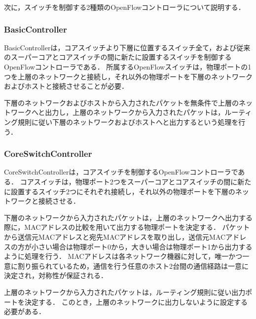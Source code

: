 次に，スイッチを制御する2種類のOpenFlowコントローラについて説明する．

\subsubsection{BasicController}

BasicControllerは，コアスイッチより下層に位置するスイッチ全て，および従来のスーパーコアとコアスイッチの間に新たに設置するスイッチを制御するOpenFlowコントローラである．
所属するOpenFlowスイッチは，物理ポートの1つを上層のネットワークと接続し，それ以外の物理ポートを下層のネットワークおよびホストと接続させることが必要．

下層のネットワークおよびホストから入力されたパケットを無条件で上層のネットワークへと出力し，上層のネットワークから入力されたパケットは，ルーティング規則に従い下層のネットワークおよびホストへと出力するという処理を行う．

\subsubsection{CoreSwitchController}

CoreSwitchControllerは，コアスイッチを制御するOpenFlowコントローラである．
コアスイッチは，物理ポート2つをスーパーコアとコアスイッチの間に新たに設置するスイッチ2つにそれぞれ接続し，それ以外の物理ポートを下層のネットワークと接続させる．

下層のネットワークから入力されたパケットは，上層のネットワークへ出力する際に，MACアドレスの比較を用いて出力する物理ポートを決定する．
パケットから送信元MACアドレスと宛先MACアドレスを取り出し，送信元MACアドレスの方が小さい場合は物理ポート0から，大きい場合は物理ポート1から出力するように処理を行う．
MACアドレスは各ネットワーク機器に対して，唯一かつ一意に割り振られているため，通信を行う任意のホスト2台間の通信経路は一意に決定され，対称性が保証される．

上層のネットワークから入力されたパケットは，ルーティング規則に従い出力ポートを決定する．
このとき，上層のネットワークに出力しないように設定する必要がある．